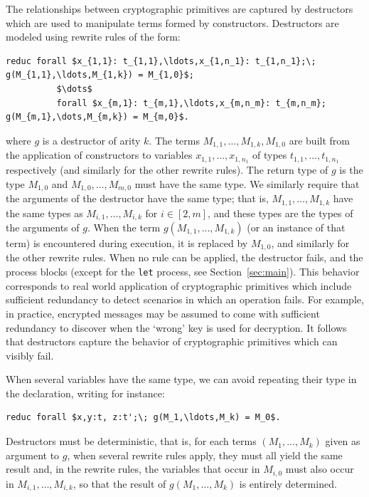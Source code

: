 \documentclass{book}
\begin{document}
The relationships between cryptographic primitives are captured by destructors which are used to manipulate terms formed by constructors. Destructors are modeled using rewrite rules of the form:
\begin{lstlisting}[numbers=none]
	reduc forall $x_{1,1}: t_{1,1},\ldots,x_{1,n_1}: t_{1,n_1};\; g(M_{1,1},\ldots,M_{1,k}) = M_{1,0}$;
	      $\dots$
	      forall $x_{m,1}: t_{m,1},\ldots,x_{m,n_m}: t_{m,n_m}; g(M_{m,1},\dots,M_{m,k}) = M_{m,0}$.
\end{lstlisting}
where $g$ is a destructor of arity $k$. The terms $M_{1,1},\ldots,M_{1,k}, M_{1,0}$ are built from the application of constructors to variables $x_{1,1},\ldots,x_{1,n_1}$ of types $t_{1,1},\ldots,t_{1,n_1}$ respectively (and similarly for the other rewrite rules). The return type of $g$ is the type $M_{1,0}$ and $M_{1,0},\dots,M_{m,0}$ must have the same type. We similarly require that the arguments of the destructor have the same type; that is, $M_{1,1},\dots,M_{1,k}$ have the same types as $M_{i,1},\dots,M_{i,k}$ for $i\in[2,m]$, and these types are the types of the arguments of $g$.
When the term $g(M_{1,1},\dots,M_{1,k})$ (or an instance of that term) is encountered during execution, it is replaced by $M_{1,0}$, and similarly for the other rewrite rules. When no rule can be applied, the destructor fails, and the process blocks (except for the \lstinline!let! process, see Section~\ref{sec:main}). This behavior corresponds to real world application of cryptographic primitives which include sufficient redundancy to detect scenarios in which an operation fails. For example, in practice, encrypted messages may be assumed to come with sufficient redundancy to discover when the `wrong' key is used for decryption. It follows that destructors capture the behavior of cryptographic primitives which can visibly fail.

When several variables have the same type, we can avoid repeating their
type in the declaration, writing for instance:
\begin{lstlisting}[numbers=none]
reduc forall $x,y:t, z:t';\; g(M_1,\ldots,M_k) = M_0$.
\end{lstlisting}

Destructors must be deterministic, that is, for each terms $(M_1, \ldots, M_k)$ given as argument to $g$, when several rewrite rules apply, they must all yield the same result and, in the rewrite rules, the variables that occur in $M_{i,0}$ must also occur in $M_{i,1},\ldots,M_{i,k}$, so that the result of $g(M_1, \ldots, M_k)$ is entirely determined.
\end{document}
